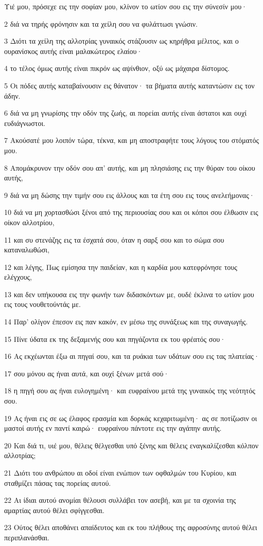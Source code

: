 \par Υιέ μου, πρόσεχε εις την σοφίαν μου, κλίνον το ωτίον σου εις την σύνεσίν μου·
\par 2 διά να τηρής φρόνησιν και τα χείλη σου να φυλάττωσι γνώσιν.
\par 3 Διότι τα χείλη της αλλοτρίας γυναικός στάζουσιν ως κηρήθρα μέλιτος, και ο ουρανίσκος αυτής είναι μαλακώτερος ελαίου·
\par 4 το τέλος όμως αυτής είναι πικρόν ως αψίνθιον, οξύ ως μάχαιρα δίστομος.
\par 5 Οι πόδες αυτής καταβαίνουσιν εις θάνατον· τα βήματα αυτής καταντώσιν εις τον άδην.
\par 6 διά να μη γνωρίσης την οδόν της ζωής, αι πορείαι αυτής είναι άστατοι και ουχί ευδιάγνωστοι.
\par 7 Ακούσατέ μου λοιπόν τώρα, τέκνα, και μη αποστραφήτε τους λόγους του στόματός μου.
\par 8 Απομάκρυνον την οδόν σου απ' αυτής, και μη πλησιάσης εις την θύραν του οίκου αυτής,
\par 9 διά να μη δώσης την τιμήν σου εις άλλους και τα έτη σου εις τους ανελεήμονας·
\par 10 διά να μη χορτασθώσι ξένοι από της περιουσίας σου και οι κόποι σου έλθωσιν εις οίκον αλλοτρίου,
\par 11 και συ στενάζης εις τα έσχατά σου, όταν η σαρξ σου και το σώμα σου καταναλωθώσι,
\par 12 και λέγης, Πως εμίσησα την παιδείαν, και η καρδία μου κατεφρόνησε τους ελέγχους,
\par 13 και δεν υπήκουσα εις την φωνήν των διδασκόντων με, ουδέ έκλινα το ωτίον μου εις τους νουθετούντάς με.
\par 14 Παρ' ολίγον έπεσον εις παν κακόν, εν μέσω της συνάξεως και της συναγωγής.
\par 15 Πίνε ύδατα εκ της δεξαμενής σου και πηγάζοντα εκ του φρέατός σου·
\par 16 Ας εκχέωνται έξω αι πηγαί σου, και τα ρυάκια των υδάτων σου εις τας πλατείας·
\par 17 σου μόνου ας ήναι αυτά, και ουχί ξένων μετά σού·
\par 18 η πηγή σου ας ήναι ευλογημένη· και ευφραίνου μετά της γυναικός της νεότητός σου.
\par 19 Ας ήναι εις σε ως έλαφος ερασμία και δορκάς κεχαριτωμένη· ας σε ποτίζωσιν οι μαστοί αυτής εν παντί καιρώ· ευφραίνου πάντοτε εις την αγάπην αυτής.
\par 20 Και διά τι, υιέ μου, θέλεις θέλγεσθαι υπό ξένης και θέλεις εναγκαλίζεσθαι κόλπον αλλοτρίας;
\par 21 Διότι του ανθρώπου αι οδοί είναι ενώπιον των οφθαλμών του Κυρίου, και σταθμίζει πάσας τας πορείας αυτού.
\par 22 Αι ίδιαι αυτού ανομίαι θέλουσι συλλάβει τον ασεβή, και με τα σχοινία της αμαρτίας αυτού θέλει σφίγγεσθαι.
\par 23 Ούτος θέλει αποθάνει απαίδευτος και εκ του πλήθους της αφροσύνης αυτού θέλει περιπλανάσθαι.


